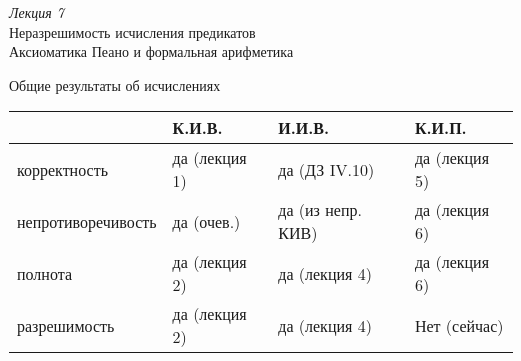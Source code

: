 \documentclass[aspectratio=169]{beamer}
\begin{document}
\begin{frame}
\begin{center}\Large {\it Лекция 7}\\\vspace{0.5cm}
Неразрешимость исчисления предикатов\\
Аксиоматика Пеано и формальная арифметика
\end{center}
\end{frame}

\begin{frame}{Общие результаты об исчислениях}
\begin{tabular}{llll}
      & К.И.В. & И.И.В. & К.И.П.\\\hline
корректность & да (лекция 1) & да (ДЗ IV.10) & да (лекция 5)\\
непротиворечивость & да (очев.) & да (из непр. КИВ) & да (лекция 6)\\
полнота & да (лекция 2) & да (лекция 4) & да (лекция 6)\\
разрешимость & да (лекция 2) & да (лекция 4) & \pause\color{red}Нет (сейчас)
\end{tabular}
\end{frame}

\begin{comment}
\begin{frame}{Полнота ИП доказывается от противного}
Попробуем построить алгоритм по доказательству --- как это делали для теоремы о полноте ИВ.
\begin{enumerate}
\item Раз $\{\neg\varphi\}$ непротиворечиво, то у него есть модель. 
Как построить эту модель ? Видимо, <<метод Британского музея>>: перебрать все доказуемые формулы. 
\item Если в процессе нашли $\neg\varphi \vdash \alpha \with \neg \alpha$, то $\vdash\varphi$ (способ перестроения --- см. ДЗ VI.3).
\item Если, {\color{olive}перебрав все $\aleph_0$ формул,} противоречия не нашли --- значит, есть модель $\{\neg\varphi\}$, и $\not\vdash\varphi$.
\item Итого: теорема о полноте ИП не поможет найти доказательство.
\end{enumerate}
\end{frame}
\end{comment}
\end{document}
